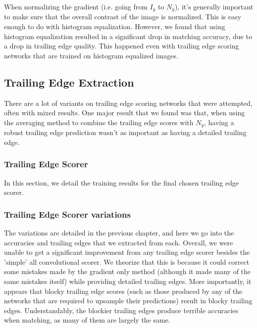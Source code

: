 When normalizing the gradient (i.e. going from $I_y$ to $N_y$), it's generally important to make sure that the overall contrast of the image is normalized.
This is easy enough to do with histogram equalization.
However, we found that using histogram equalization resulted in a significant drop in matching accuracy, due to a drop in trailing edge quality.
This happened even with trailing edge scoring networks that are trained on histogram equalized images.


\subsection{Trailing Edge Extraction}

There are a lot of variants on trailing edge scoring networks that were attempted, often with mixed results.
One major result that we found was that, when using the averaging method to combine the trailing edge scores with $N_y$, having a robust trailing edge prediction wasn't as important as having a detailed trailing edge.

\subsubsection{Trailing Edge Scorer}

In this section, we detail the training results for the final chosen trailing edge scorer. %

\subsubsection{Trailing Edge Scorer variations}

The variations are detailed in the previous chapter, and here we go into the accuracies and trailing edges that we extracted from each.
Overall, we were unable to get a significant improvement from any trailing edge scorer besides the 'simple' all convolutional scorer.
We theorize that this is because it could correct some mistakes made by the gradient only method (although it made many of the same mistakes itself) while providing detailed trailing edges.
More importantly, it appears that blocky trailing edge scores (such as those produced by any of the networks that are required to upsample their predictions) result in blocky trailing edges. %
Understandably, the blockier trailing edges produce terrible accuracies when matching, as many of them are largely the same.

